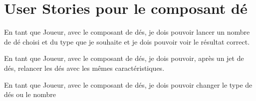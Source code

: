 \chapter{User Stories pour le composant dé}

En tant que Joueur, avec le composant de dés, je dois pouvoir lancer un nombre
de dé choisi et du type que je souhaite et je dois pouvoir voir le résultat
correct.
~

En tant que Joueur, avec le composant de dés, je dois pouvoir, après un jet de
dés, relancer les dés avec les mêmes caractéristiques.
~

En tant que Joueur, avec le composant de dés, je dois pouvoir changer le type de
dés ou le nombre

\clearpage
